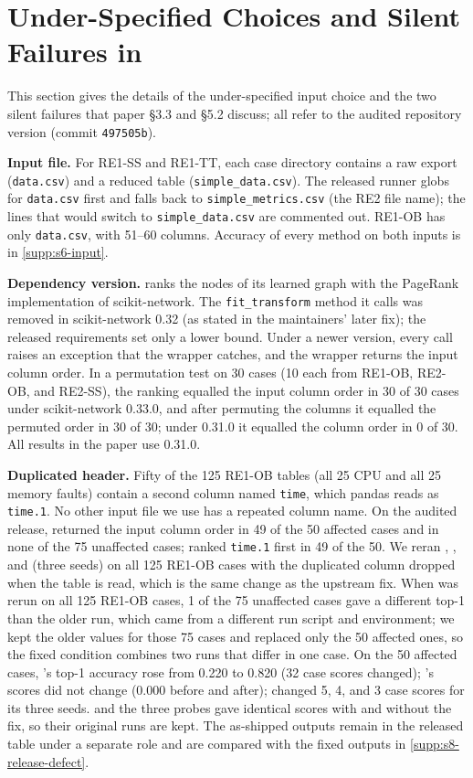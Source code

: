 \documentclass[10pt]{article}
\begin{document}
\section{Under-Specified Choices and Silent Failures in \rcaeval}
\label{sec:defects}

This section gives the details of the under-specified input choice and the two silent failures that paper \S3.3 and \S5.2 discuss; all refer to the audited repository version (commit \texttt{497505b}).

\textbf{Input file.}
For RE1-SS and RE1-TT, each case directory contains a raw export (\texttt{data.csv}) and a reduced table (\texttt{simple\_data.csv}).
The released runner globs for \texttt{data.csv} first and falls back to \texttt{simple\_metrics.csv} (the RE2 file name); the lines that would switch to \texttt{simple\_data.csv} are commented out.
RE1-OB has only \texttt{data.csv}, with 51--60 columns.
Accuracy of every method on both inputs is in \cref{supp:s6-input}.

\textbf{Dependency version.}
\causalrca ranks the nodes of its learned graph with the PageRank implementation of scikit-network.
The \texttt{fit\_transform} method it calls was removed in scikit-network 0.32 (as stated in the maintainers' later fix); the released requirements set only a lower bound.
Under a newer version, every call raises an exception that the wrapper catches, and the wrapper returns the input column order.
In a permutation test on 30 cases (10 each from RE1-OB, RE2-OB, and RE2-SS), the ranking equalled the input column order in 30 of 30 cases under scikit-network 0.33.0, and after permuting the columns it equalled the permuted order in 30 of 30; under 0.31.0 it equalled the column order in 0 of 30.
All \causalrca results in the paper use 0.31.0.

\textbf{Duplicated header.}
Fifty of the 125 RE1-OB tables (all 25 CPU and all 25 memory faults) contain a second column named \texttt{time}, which pandas reads as \texttt{time.1}.
No other \rcaeval input file we use has a repeated column name.
On the audited release, \circa returned the input column order in 49 of the 50 affected cases and in none of the 75 unaffected cases; \ediag ranked \texttt{time.1} first in 49 of the 50.
We reran \circa, \ediag, and \rcd (three seeds) on all 125 RE1-OB cases with the duplicated column dropped when the table is read, which is the same change as the upstream fix.
When \circa was rerun on all 125 RE1-OB cases, 1 of the 75 unaffected cases gave a different top-1 than the older run, which came from a different run script and environment; we kept the older values for those 75 cases and replaced only the 50 affected ones, so the fixed condition combines two runs that differ in one case.
On the 50 affected cases, \circa's top-1 accuracy rose from 0.220 to 0.820 (32 case scores changed); \ediag's scores did not change (0.000 before and after); \rcd changed 5, 4, and 3 case scores for its three seeds.
\baro and the three probes gave identical scores with and without the fix, so their original runs are kept.
The as-shipped outputs remain in the released table under a separate role and are compared with the fixed outputs in \cref{supp:s8-release-defect}.
\end{document}
